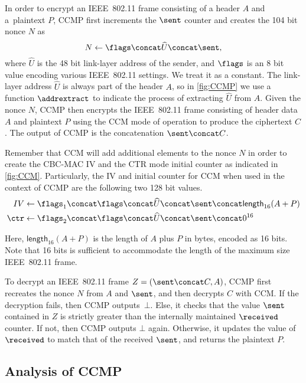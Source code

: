 In order to encrypt an IEEE~802.11 frame consisting of a header $A$ and a~plaintext $P$,
CCMP first increments the $\sent$ counter and creates the 104 bit nonce $N$ as
\begin{equation}\label{eq:802.11:CCMP:nonce_creation}
	N \gets \flags \concat \widehat{U} \concat \sent ,
\end{equation}
where $\widehat{U}$ is the 48 bit link-layer address of the sender,
and $\flags$ is an 8 bit value encoding various IEEE~802.11 settings.
We treat it as a constant.
The link-layer address $\widehat{U}$ is always part of the header $A$,
so in \cref{fig:CCMP} we use a function $\addrextract$ to indicate the process of extracting $\widehat{U}$ from $A$.
Given the nonce $N$,
CCMP then encrypts the IEEE~802.11 frame consisting of header data $A$ and plaintext $P$ using the CCM mode of operation to produce the ciphertext $C$.
The output of CCMP is the concatenation $\sent \concat C$.

Remember that CCM will add additional elements to the nonce $N$ in order to create the CBC-MAC IV and the CTR mode initial counter as indicated in \cref{fig:CCM}.
Particularly,
the IV and initial counter for CCM when used in the context of CCMP are the following two 128 bit values.
\begin{align}
	IV &\gets \flags_1 \concat \flags \concat \widehat{U} \concat \sent \concat \mathsf{length}_{16}(A + P) \\
	\ctr &\gets \flags_2 \concat \flags \concat \widehat{U} \concat \sent \concat 0^{16}
\end{align}

Here, $\mathsf{length}_{16}(A + P)$ is the length of $A$ plus $P$ in bytes,
encoded as 16 bits.
Note that 16 bits is sufficient to accommodate the length of the maximum size IEEE~802.11 frame.



To decrypt an IEEE~802.11 frame $Z = (\sent \concat C, A)$,
CCMP first recreates the nonce $N$ from $A$ and $\sent$,
and then decrypts $C$ with CCM.
If the decryption fails,
then CCMP outputs~$\bot$.
Else,
it checks that the value $\sent$ contained in $Z$ is strictly greater than the internally maintained $\received$ counter.
If not,
then CCMP outputs $\bot$ again.
Otherwise,
it updates the value of $\received$ to match that of the received $\sent$,
and returns the plaintext $P$. 





\subsection{Analysis of CCMP}\label{sec:802.11:CCMP:analysis}





